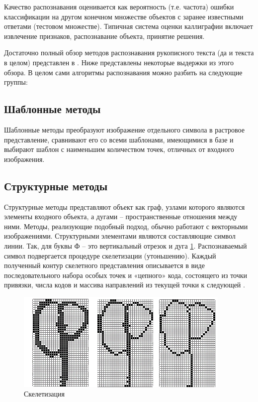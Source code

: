 Качество распознавания оценивается как вероятность (т.е. частота) ошибки
классификации на другом конечном множестве объектов с заранее известными
ответами (тестовом множестве). Типичная система оценки каллиграфии включает извлечение признаков, распознавание объекта, принятие решения.

Достаточно полный обзор методов распознавания рукописного текста (да и текста в целом) представлен в \cite{demin}. Ниже представлены некоторые выдержки из этого обзора.
В целом сами алгоритмы распознавания можно разбить на следующие группы:

\subsection{Шаблонные методы}

Шаблонные методы преобразуют изображение отдельного символа в растровое
представление, сравнивают его со всеми шаблонами, имеющимися в базе и выбирают
шаблон с наименьшим количеством точек, отличных от входного изображения.

\subsection{Структурные методы}

Структурные методы \cite{fuk, gorlov} представляют объект как граф, узлами которого
являются элементы входного объекта, а дугами -- пространственные отношения между
ними. Методы, реализующие подобный подход, обычно работают с векторными
изображениями. Структурными элементами являются составляющие символ линии.
Так, для буквы Ф -- это вертикальный отрезок и дуга \ref{img_skelet}. Распознаваемый символ
подвергается процедуре скелетизации (утоньшению). Каждый полученный
контур скелетного представления описывается в виде последовательного набора
особых точек и «цепного» кода, состоящего из точки привязки, числа кодов и массива
направлений из текущей точки к следующей \cite{ocrai}.

\begin{figure}[h]
\centering
\includegraphics[width=0.75\linewidth,keepaspectratio]{images/intro_skelet_1}
\caption{Скелетизация}
\label{img_skelet}
\end{figure}

